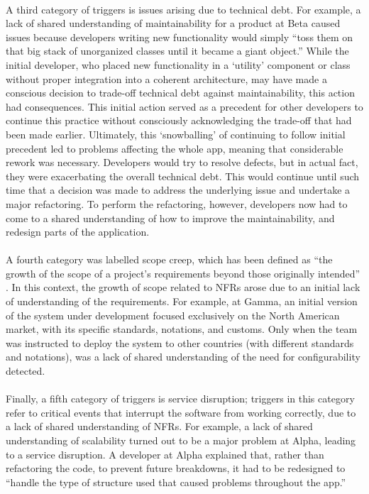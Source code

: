 \documentclass[smallextended]{svjour3}        %
\providecommand{\DIFaddtex}[1]{{\protect\color{blue}\uwave{#1}}} %
\providecommand{\DIFaddbegin}{} %
\providecommand{\DIFaddend}{} %
\providecommand{\DIFadd}[1]{\texorpdfstring{\DIFaddtex{#1}}{#1}} %
\newcommand{\DIFaddincludegraphics}[2][]{{\color{blue}\fbox{\DIFOincludegraphics[#1]{#2}}}} %
\DeclareRobustCommand{\DIFaddbegin}{\DIFOaddbegin \let\includegraphics\DIFaddincludegraphics} %
\DeclareRobustCommand{\DIFaddend}{\DIFOaddend \let\includegraphics\DIFOincludegraphics} %
\begin{document}
\DIFaddbegin \paragraph{\DIFadd{Technical debt}} \DIFaddend A third category of triggers is issues arising due to technical debt. For example, a lack of shared understanding of maintainability for a product at Beta caused issues because developers writing new functionality would simply ``toss them on that big stack of unorganized classes until it became a giant object.'' While the initial developer, who placed new functionality in a `utility' component or class without proper integration into a coherent architecture, may have made a conscious decision to trade-off technical debt against maintainability,  this action had consequences. This initial action served as a precedent for other developers to continue this practice without consciously acknowledging the trade-off that had been made earlier. 
Ultimately, this `snowballing' of continuing to follow initial precedent led to problems affecting the whole app,
meaning that considerable rework was necessary. Developers would try to resolve defects, but in actual fact, they were exacerbating the overall technical debt. This would continue until such time that a decision was made to address the underlying issue and undertake a major refactoring. To perform the refactoring, however, developers now had to come to a shared understanding of how to improve the maintainability, and redesign parts of the application. 

\DIFaddbegin \paragraph{\DIFadd{Scope creep}} \DIFaddend A fourth category was labelled scope creep, which has been defined as ``the growth of the scope of a project's requirements beyond those originally intended'' \citep{williams2009exploring}. In this context, the growth of scope related to NFRs arose due to an initial lack of understanding of the requirements. For example, at Gamma, an initial version of the system under development focused exclusively on the North American market, with its specific standards, notations, and customs. Only when the team was instructed to deploy the system to other countries (with different standards and notations), was a lack of shared understanding of the need for configurability detected. 

\DIFaddbegin \paragraph{\DIFadd{Service disruption}} \DIFaddend Finally, a fifth category of triggers is service disruption; triggers in this category refer to critical events that interrupt the software from working correctly, due to a lack of shared understanding of NFRs. For example, a lack of shared understanding of scalability turned out to be a major problem at Alpha, leading to a service disruption. A developer at Alpha explained that, rather than refactoring the code, to prevent future breakdowns, it had to be redesigned to \textmd{``handle the type of structure used that caused problems throughout the app.''}
\end{document}
